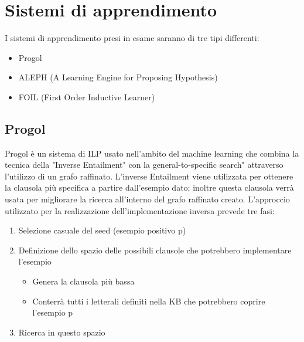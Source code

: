 \section{Sistemi di apprendimento}

I sistemi di apprendimento presi in esame saranno di tre tipi differenti:

\begin{itemize}
	\item Progol 
	\item ALEPH (A Learning Engine for Proposing Hypothesis)
	\item FOIL (First Order Inductive Learner)
\end{itemize}

\subsection{Progol}
Progol è un sistema di ILP usato nell'ambito del machine learning che combina la tecnica della "Inverse Entailment" con la general-to-specific search" attraverso l'utilizzo di un grafo raffinato.
L'inverse Entailment viene utilizzata per ottenere la clausola più specifica a partire dall'esempio dato; inoltre questa clausola verrà usata per migliorare la ricerca all'interno del grafo raffinato creato.
L'approccio utilizzato per la realizzazione dell'implementazione inversa prevede tre fasi:
\begin{enumerate}
\item Selezione casuale del seed (esempio positivo p)
\item Definizione dello spazio delle possibili clausole che potrebbero implementare l'esempio
	\begin{itemize}
		\item Genera la clausola più bassa
		\item Conterrà tutti i letterali definiti nella KB che potrebbero coprire l'esempio p
	\end{itemize}
\item Ricerca in questo spazio 
\end{enumerate}


